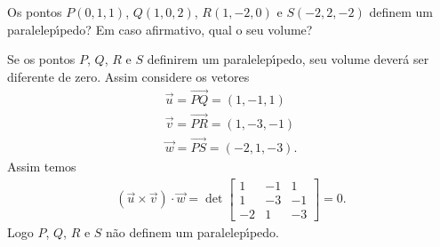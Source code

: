 \begin{exemplo}
  Os pontos $P(0,1,1)$, $Q(1,0,2)$, $R(1,-2,0)$ e $S(-2,2,-2)$ definem um paralelep{\'\i}pedo? Em caso afirmativo, qual o seu volume?
  \begin{solucao}
    Se os pontos $P$, $Q$, $R$ e $S$ definirem um paralelep{\'\i}pedo, seu volume dever\'a ser diferente de zero. Assim considere os vetores
    \begin{align*}
      \vec{u} = \vec{PQ} = (1,-1,1)\\
      \vec{v} = \vec{PR} = (1,-3,-1)\\
      \vec{w} = \vec{PS} = (-2,1,-3).
    \end{align*}
    Assim temos
    \begin{align*}
      (\vec{u}\times\vec{v})\cdot\vec{w} = \det \begin{bmatrix}
        1 & -1 & 1\\
        1 & -3 & -1\\
        -2 & 1 & -3
      \end{bmatrix} = 0.
    \end{align*}
    Logo $P$, $Q$, $R$ e $S$ n\~ao definem um paralelep{\'\i}pedo.
  \end{solucao}
\end{exemplo}

